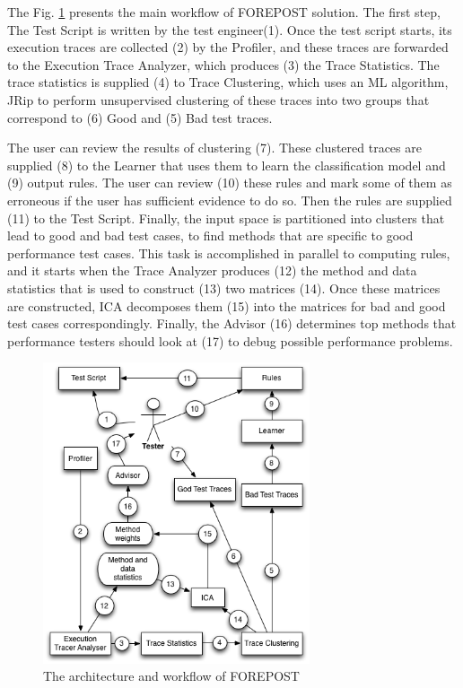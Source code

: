 The Fig. \ref{fig:forepost} presents the main workflow of FOREPOST solution. The first step,  The Test Script is written  by the test engineer(1). Once the test script starts, its execution traces are collected (2) by the Profiler, and these traces are forwarded to the Execution Trace Analyzer, which produces (3) the Trace Statistics. The trace statistics is supplied (4) to Trace Clustering, which uses an ML algorithm, JRip to perform unsupervised clustering of these traces into two groups that correspond to (6) Good and (5) Bad test traces. 

The user can review the results of clustering (7). These clustered traces are supplied (8) to the Learner that uses them to learn the classification model and (9) output rules. The user can review (10) these rules and mark some of them as erroneous if the user has sufficient evidence to do so. Then the rules are supplied (11) to the Test Script. Finally, the input space is partitioned into clusters that lead to good and bad test cases, to find methods that are specific to good performance test cases. This task is accomplished in parallel to computing rules, and it starts when the Trace Analyzer produces (12) the method and data statistics that is used to construct (13) two matrices (14). Once these matrices are constructed, ICA decomposes them (15) into the matrices for bad and good test cases correspondingly. Finally, the Advisor (16) determines top methods that performance testers should look at (17) to debug possible performance problems.


\begin{figure}[!ht]
\centering
\includegraphics[width=0.7\textwidth]{./images/FOREPOST.png}
\caption{The architecture and workflow of FOREPOST}
\label{fig:forepost}
\end{figure}


